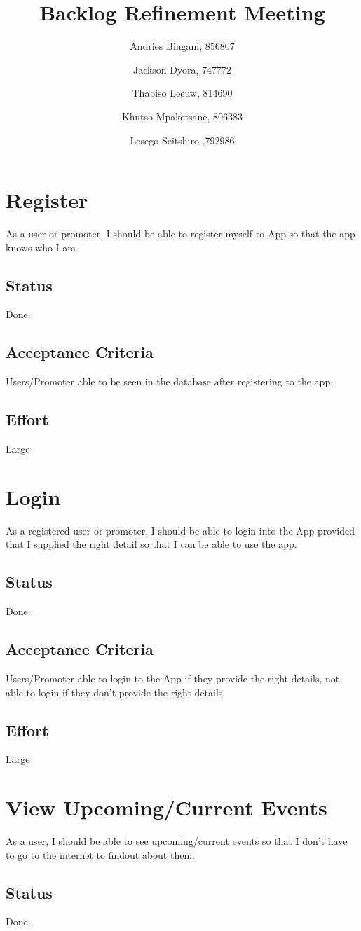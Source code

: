\documentclass[10pt,a4paper]{article}
\title{Backlog Refinement Meeting}
\author{
  Andries Bingani, 856807 \and
  Jackson Dyora, 747772\and
  Thabiso Leeuw, 814690 \and
  Khutso Mpaketsane, 806383 \and
  Lesego Seitshiro ,792986
}
\begin{document}
\maketitle

\section{Register}
As a user or promoter, I should be able to register myself to App so that the app knows who I am.
\subsection{Status}
Done.

\subsection{Acceptance Criteria}
Users/Promoter able to be seen in the database after registering to the app.
\subsection{Effort}
Large

\section{Login}
As a registered user or promoter, I should be able to login into the App provided that I supplied the right detail so that I can be able to use the app.
\subsection{Status}
Done.
\subsection{Acceptance Criteria}
Users/Promoter able to login to the App if they provide the right details, not able to login if they don't provide the right details.
\subsection{Effort}
Large
\section{View Upcoming/Current Events}
As a user, I should be able to see upcoming/current events so that I don't have to go to the internet to findout about them.
\subsection{Status}
Done.
\end{document}
